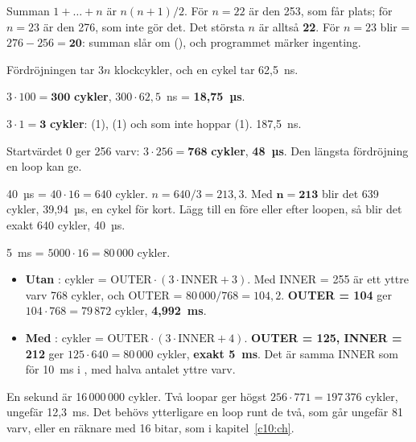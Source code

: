 Summan $1 + \dots + n$ är $n(n + 1) / 2$. För $n = 22$ är den 253, som får plats; för
$n = 23$ är den 276, som inte gör det. Det största $n$ är alltså \textbf{22}. För $n = 23$ blir
 = $276 - 256 = \mathbf{20}$: summan slår om (), och programmet märker
ingenting.

Fördröjningen tar $3n$ klockcykler, och en cykel tar 62,5~ns.

$3 \cdot 100 = \mathbf{300}$ \textbf{cykler}, $300 \cdot 62,5$~ns = \textbf{18,75~µs}.

$3 \cdot 1 = \mathbf{3}$ \textbf{cykler}:  (1),  (1) och  som
inte hoppar (1). 187,5~ns.

Startvärdet 0 ger 256 varv: $3 \cdot 256 = \mathbf{768}$ \textbf{cykler}, \textbf{48~µs}.
Den längsta fördröjning en loop kan ge.

40~µs = $40 \cdot 16 = 640$ cykler. $n = 640 / 3 = 213,3$. Med \textbf{$\mathbf{n = 213}$}
blir det 639 cykler, 39,94~µs, en cykel för kort. Lägg till en  före eller efter loopen,
så blir det exakt 640 cykler, 40~µs.

5~ms = $5000 \cdot 16 = 80\,000$ cykler.
\begin{itemize}
  \item \textbf{Utan }: cykler = $\text{OUTER} \cdot (3 \cdot \text{INNER} + 3)$. Med
    INNER = 255 är ett yttre varv 768 cykler, och OUTER = $80\,000 / 768 = 104,2$.
    \textbf{OUTER = 104} ger $104 \cdot 768 = 79\,872$ cykler, \textbf{4,992~ms}.
  \item \textbf{Med }: cykler = $\text{OUTER} \cdot (3 \cdot \text{INNER} + 4)$.
    \textbf{OUTER = 125, INNER = 212} ger $125 \cdot 640 = 80\,000$ cykler, \textbf{exakt 5~ms}.
    Det är samma INNER som för 10~ms i , med halva antalet yttre varv.
\end{itemize}

En sekund är 16\,000\,000 cykler. Två loopar ger högst $256 \cdot 771 = 197\,376$ cykler,
ungefär 12,3~ms. Det behövs ytterligare en loop runt de två, som går ungefär 81 varv, eller en
räknare med 16 bitar, som i kapitel~\ref{c10:ch}.

\leavevmode

